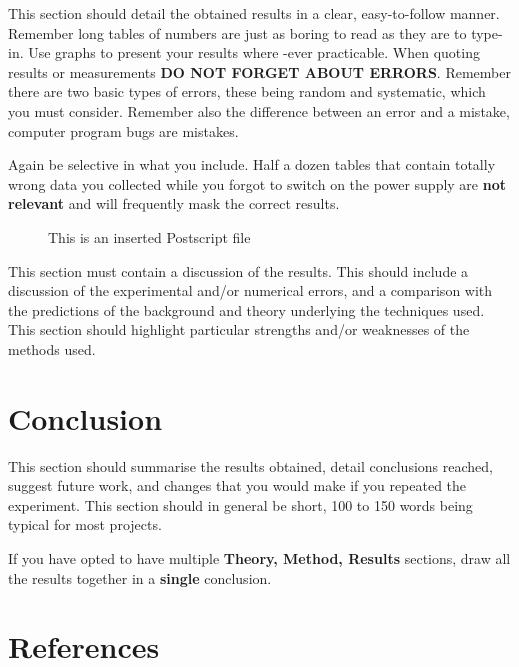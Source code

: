 \documentclass[a4paper,12pt]{article}
\begin{document}
This section should detail the obtained results in a clear,
easy-to-follow manner. Remember long tables of numbers are just as boring to
read as they are to type-in. Use graphs to present your results where
-ever practicable. When quoting results or measurements
{\bf DO NOT FORGET ABOUT ERRORS}. Remember there are two basic types
of errors, these being random and systematic, which you must consider.
Remember also the difference between an error and a mistake, computer
program bugs are mistakes.

 
Again be selective in what you include. Half a dozen
tables that contain totally wrong data you collected while you forgot
to switch on the power supply are {\bf not relevant} and will frequently
mask the correct results. 
%
%
\begin{figure}[htb]     %
        \begin{center}
                \leavevmode             %
                \epsfxsize=90mm         %
\end{center}
\caption{This is an inserted Postscript file}
\end{figure}

This section must contain a discussion of the results. This should
include a discussion of the experimental and/or numerical errors, and a
comparison with the predictions of the background and theory underlying
the techniques used. This section should highlight particular strengths
and/or weaknesses of the methods used.

 
\section{Conclusion}
This section should summarise the results obtained, detail
conclusions reached, suggest future work, and changes that you would make if you repeated the
experiment. This section should in general be short, 100 to 150 words
being typical for most projects.
\par\noindent
If you have opted to have multiple {\bf Theory, Method, Results}
sections, draw all the results together in a {\bf single} conclusion.
\section{References}
\end{document}
